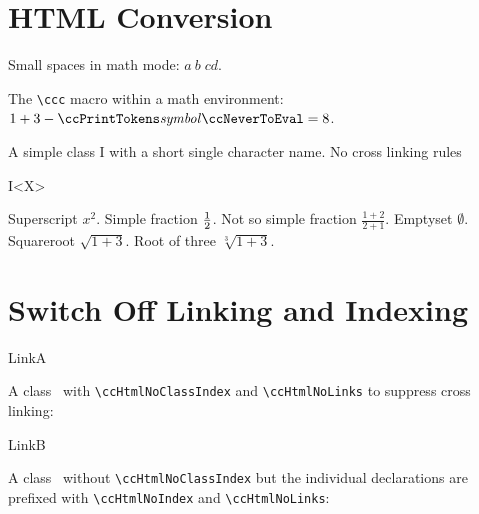\documentclass[12pt]{article}
\begin{document}
{%
\section{HTML Conversion}

Small spaces in math mode: $a\:b\;c\!d$.

The \verb+\ccc+ macro within a math environment: $1 + 3 - \ccc{symbol} = 8$.

A simple class I with a short single character name. No cross linking rules

\begin{ccClassTemplate}{I<X>}
\end{ccClassTemplate}

Superscript $x^2$.
Simple fraction ${1 \over 2}$.
Not so simple fraction $\frac{1+2}{2+1}$.
Emptyset $\emptyset$.
Squareroot $\sqrt{1+3}$.
Root of three $\sqrt[3]{1+3}$.


\section{Switch Off Linking and Indexing}

\ccThreeToTwo

\ccHtmlNoClassIndex\ccHtmlNoLinks
\begin{ccClass}{LinkA}

A class \ccClassName\ with \verb+\ccHtmlNoClassIndex+ and
\verb+\ccHtmlNoLinks+ to suppress cross linking:

  \ccGlue
  \ccGlue
\end{ccClass}


\begin{ccClass}{LinkB}

A class \ccClassName\ without \verb+\ccHtmlNoClassIndex+ but the individual
declarations are prefixed with \verb+\ccHtmlNoIndex+ and 
\verb+\ccHtmlNoLinks+:


\end{ccClass}}
\end{document}
